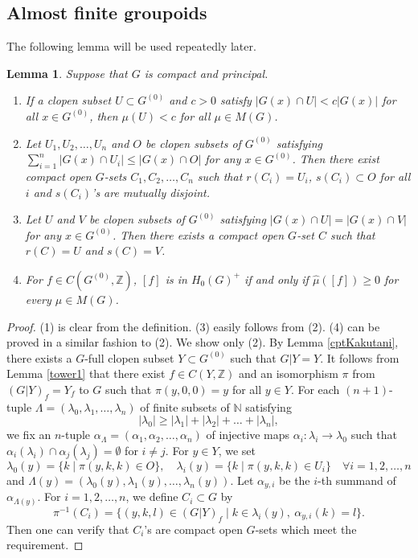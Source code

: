 \documentclass[11pt]{article}
\newtheorem{lem}[thm]{Lemma}
\theoremstyle{definition}
\newcommand{\N}{\mathbb{N}}
\newcommand{\Z}{\mathbb{Z}}
\begin{document}
\subsection{Almost finite groupoids}

The following lemma will be used repeatedly later. 

\begin{lem}\label{cptHopf}
Suppose that $G$ is compact and principal. 
\begin{enumerate}
\item If a clopen subset $U\subset G^{(0)}$ and $c>0$ satisfy 
$\lvert G(x)\cap U\rvert<c\lvert G(x)\rvert$ for all $x\in G^{(0)}$, then 
$\mu(U)<c$ for all $\mu\in M(G)$. 
\item Let $U_1,U_2,\dots,U_n$ and $O$ be clopen subsets of $G^{(0)}$ 
satisfying $\sum_{i=1}^n\lvert G(x)\cap U_i\rvert\leq\lvert G(x)\cap O\rvert$ 
for any $x\in G^{(0)}$. 
Then there exist compact open $G$-sets $C_1,C_2,\dots,C_n$ such that 
$r(C_i)=U_i$, $s(C_i)\subset O$ for all $i$ and 
$s(C_i)$'s are mutually disjoint. 
\item Let $U$ and $V$ be clopen subsets of $G^{(0)}$ 
satisfying $\lvert G(x)\cap U\rvert=\lvert G(x)\cap V\rvert$ 
for any $x\in G^{(0)}$. 
Then there exists a compact open $G$-set $C$ such that 
$r(C)=U$ and $s(C)=V$. 
\item For $f\in C(G^{(0)},\Z)$, 
$[f]$ is in $H_0(G)^+$ if and only if 
$\hat\mu([f])\geq0$ for every $\mu\in M(G)$. 
\end{enumerate}
\end{lem}
\begin{proof}
(1) is clear from the definition. 
(3) easily follows from (2). 
(4) can be proved in a similar fashion to (2). 
We show only (2). 
By Lemma \ref{cptKakutani}, 
there exists a $G$-full clopen subset $Y\subset G^{(0)}$ 
such that $G|Y=Y$. 
It follows from Lemma \ref{tower1} that 
there exist $f\in C(Y,\Z)$ and an isomorphism $\pi$ from $(G|Y)_f=Y_f$ to $G$ 
such that $\pi(y,0,0)=y$ for all $y\in Y$. 
For each $(n{+}1)$-tuple $\Lambda=(\lambda_0,\lambda_1,\dots,\lambda_n)$ 
of finite subsets of $\N$ satisfying 
\[
\lvert\lambda_0\rvert
\geq\lvert\lambda_1\rvert+\lvert\lambda_2\rvert+\dots+\lvert\lambda_n\rvert, 
\]
we fix an $n$-tuple $\alpha_\Lambda=(\alpha_1,\alpha_2,\dots,\alpha_n)$ 
of injective maps $\alpha_i:\lambda_i\to\lambda_0$ 
such that $\alpha_i(\lambda_i)\cap\alpha_j(\lambda_j)=\emptyset$ 
for $i\neq j$. 
For $y\in Y$, we set 
\[
\lambda_0(y)=\{k\mid\pi(y,k,k)\in O\},\quad 
\lambda_i(y)=\{k\mid\pi(y,k,k)\in U_i\}\quad
\forall i=1,2,\dots,n
\]
and $\Lambda(y)=(\lambda_0(y),\lambda_1(y),\dots,\lambda_n(y))$. 
Let $\alpha_{y,i}$ be the $i$-th summand of $\alpha_{\Lambda(y)}$. 
For $i=1,2,\dots,n$, we define $C_i\subset G$ by 
\[
\pi^{-1}(C_i)=\{(y,k,l)\in(G|Y)_f\mid
k\in\lambda_i(y),\ \alpha_{y,i}(k)=l\}. 
\]
Then one can verify that 
$C_i$'s are compact open $G$-sets which meet the requirement. 
\end{proof}
\end{document}
